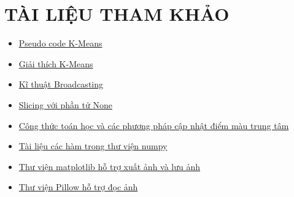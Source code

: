 \documentclass{report}
\begin{document}
\section{TÀI LIỆU THAM KHẢO}
\begin{itemize}
    \item 
    \href{https://www.youtube.com/watch?v=uLs-EYUpGAw&t=524s}{Pseudo code K-Means}

    \item
    \href{https://www.youtube.com/watch?v=4b5d3muPQmA}{Giải thích K-Means}
    
    \item \href{https://numpy.org/doc/stable/user/basics.broadcasting.html}{Kĩ thuật Broadcasting}

    \item \href{https://stackoverflow.com/questions/1408311/numpy-array-slice-using-none}{Slicing với phần tử None}

    \item \href{https://www.researchgate.net/publication/321502735_Centroid_Update_Approach_to_K-Means_Clustering}{Công thức toán học và các phương pháp cập nhật điểm màu trung tâm}

    \item \href{https://numpy.org/doc/stable/user/index.html#user}{Tài liệu các hàm trong thư viện numpy}

    \item \href{https://matplotlib.org/stable/api/_as_gen/matplotlib.pyplot.imshow.html}{Thư viện matplotlib hỗ trợ xuất ảnh và lưu ảnh}

    \item \href{https://pillow.readthedocs.io/en/stable/reference/Image.html}{Thư viện Pillow hỗ trợ đọc ảnh}
    
\end{itemize}
\end{document}
